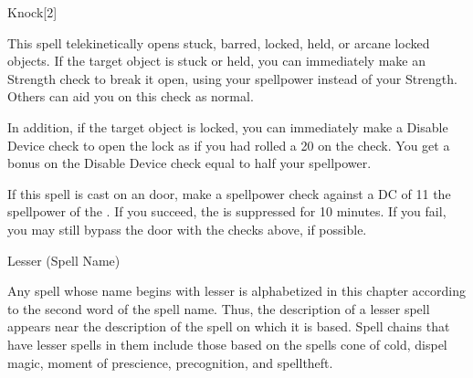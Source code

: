 \begin{spellsection}{Knock}[2]
    \begin{spellheader}
    \end{spellheader}
    \begin{spellcontent}
        \begin{spelltargetinginfo}
        \end{spelltargetinginfo}
        \begin{spelleffects}
            \spelleffect This spell telekinetically opens stuck, barred, locked, held, or arcane locked objects. If the target object is stuck or held, you can immediately make an Strength check to break it open, using your spellpower instead of your Strength. Others can aid you on this check as normal.

            In addition, if the target object is locked, you can immediately make a Disable Device check to open the lock as if you had rolled a 20 on the check. You get a bonus on the Disable Device check equal to half your spellpower.
        \end{spelleffects}
    \end{spellcontent}
    \begin{spellfooter}
        \spellnotes If this spell is cast on an  door, make a spellpower check against a DC of 11 \add the spellpower of the . If you succeed, the  is suppressed for 10 minutes. If you fail, you may still bypass the door with the checks above, if possible.
        \miscastrandom
    \end{spellfooter}
\end{spellsection}

\begin{spellsection}{Lesser (Spell Name)}
    \par Any spell whose name begins with lesser is alphabetized in this chapter according to the second word of the spell name. Thus, the description of a lesser spell appears near the description of the spell on which it is based. Spell chains that have lesser spells in them include those based on the spells cone of cold, dispel magic, moment of prescience, precognition, and spelltheft.
\end{spellsection}

